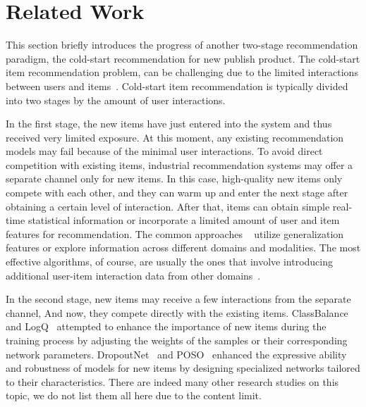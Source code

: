 \section{Related Work}
This section briefly introduces the progress of another two-stage recommendation paradigm, the cold-start recommendation for new publish product. The cold-start item recommendation problem, can be challenging due to the limited interactions between users and items~\cite{wu2022adversarial}. Cold-start item recommendation is typically divided into two stages by the amount of user interactions. 

In the first stage, the new items have just entered into the system and thus received very limited exposure. At this moment, any existing recommendation models may fail because of the minimal user interactions. To avoid direct competition with existing items, industrial recommendation systems may offer a separate channel only for new items. In this case, high-quality new items only compete with each other, and they can warm up and enter the next stage after obtaining a certain level of interaction. After that, items can obtain simple real-time statistical information or incorporate a limited amount of user and item features for recommendation. The common approaches ~\cite{cold_cv,cold_context,cold_cross_domain,cold_graph,cold_poi} utilize generalization features or explore information across different domains and modalities. The most effective algorithms, of course, are usually the ones that involve introducing additional user-item interaction data from other domains~\cite{zhang2022keep,rec4ad}.

In the second stage, new items may receive a few interactions from the separate channel, And now, they compete directly with the existing items. 
ClassBalance~\cite{class_re} and LogQ~\cite{logq} attempted to enhance the importance of new items during the training process by adjusting the weights of the samples or their corresponding network parameters. 
DropoutNet~\cite{dropoutnet} and POSO~\cite{poso} enhanced the expressive ability and robustness of models for new items by designing specialized networks tailored to their characteristics. There are indeed many other research studies on this topic, we do not list them all here due to the content limit.